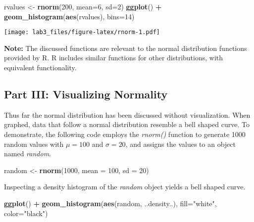 \documentclass[]{article}
\newenvironment{Shaded}{\begin{snugshade}}{\end{snugshade}}
\newcommand{\KeywordTok}[1]{\textcolor[rgb]{0.13,0.29,0.53}{\textbf{#1}}}
\newcommand{\DataTypeTok}[1]{\textcolor[rgb]{0.13,0.29,0.53}{#1}}
\newcommand{\DecValTok}[1]{\textcolor[rgb]{0.00,0.00,0.81}{#1}}
\newcommand{\StringTok}[1]{\textcolor[rgb]{0.31,0.60,0.02}{#1}}
\newcommand{\OperatorTok}[1]{\textcolor[rgb]{0.81,0.36,0.00}{\textbf{#1}}}
\newcommand{\NormalTok}[1]{#1}
\begin{document}
\begin{Shaded}
\begin{Highlighting}[]
\NormalTok{rvalues <-}\StringTok{ }\KeywordTok{rnorm}\NormalTok{(}\DecValTok{200}\NormalTok{, }\DataTypeTok{mean=}\DecValTok{6}\NormalTok{, }\DataTypeTok{sd=}\DecValTok{2}\NormalTok{)}
\KeywordTok{ggplot}\NormalTok{() }\OperatorTok{+}
\StringTok{  }\KeywordTok{geom_histogram}\NormalTok{(}\KeywordTok{aes}\NormalTok{(rvalues), }\DataTypeTok{bins=}\DecValTok{14}\NormalTok{)}
\end{Highlighting}
\end{Shaded}

\texttt{[image: lab3\_files/figure-latex/rnorm-1.pdf]}

\textbf{Note:} The discussed functions are relevant to the normal
distribution functions provided by R. R includes similar functions for
other distributions, with equivalent functionality.

\subsection{Part III: Visualizing
Normality}\label{part-iii-visualizing-normality}

Thus far the normal distribution has been discussed without
visualization. When graphed, data that follow a normal distribution
resemble a bell shaped curve. To demonstrate, the following code employs
the \emph{rnorm()} function to generate 1000 random values with
\(\mu = 100\) and \(\sigma = 20\), and assigns the values to an object
named \emph{random}.

\begin{Shaded}
\begin{Highlighting}[]
\NormalTok{random <-}\StringTok{ }\KeywordTok{rnorm}\NormalTok{(}\DecValTok{1000}\NormalTok{, }\DataTypeTok{mean =} \DecValTok{100}\NormalTok{, }\DataTypeTok{sd =} \DecValTok{20}\NormalTok{)}
\end{Highlighting}
\end{Shaded}

Inspecting a density histogram of the \emph{random} object yields a bell
shaped curve.

\begin{Shaded}
\begin{Highlighting}[]
\KeywordTok{ggplot}\NormalTok{() }\OperatorTok{+}
\StringTok{  }\KeywordTok{geom_histogram}\NormalTok{(}\KeywordTok{aes}\NormalTok{(random, ..density..), }\DataTypeTok{fill=}\StringTok{"white"}\NormalTok{, }\DataTypeTok{color=}\StringTok{"black"}\NormalTok{)}
\end{Highlighting}
\end{Shaded}
\end{document}
